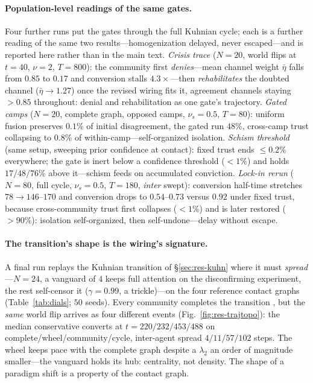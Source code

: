 \documentclass[runningheads]{llncs}
\begin{document}
\paragraph{Population-level readings of the same gates.}
Four further runs put the gates through the full Kuhnian cycle; each is a further reading of
the same two results---homogenization delayed, never escaped---and is reported here rather
than in the main text. \emph{Crisis trace} ($N{=}20$, world flips at $t{=}40$, $\nu{=}2$,
$T{=}800$): the community first \emph{denies}---mean channel weight $\bar\eta$ falls from
$0.85$ to $0.17$ and conversion stalls $4.3\times$---then \emph{rehabilitates} the doubted
channel ($\bar\eta\to1.27$) once the revised wiring fits it, agreement channels staying
$>0.85$ throughout: denial and rehabilitation as one gate's trajectory. \emph{Gated camps}
($N{=}20$, complete graph, opposed camps, $\nu_s{=}0.5$, $T{=}80$): uniform fusion preserves
$0.1\%$ of initial disagreement, the gated run $48\%$, cross-camp trust collapsing to
$0.8\%$ of within-camp---self-organized isolation. \emph{Schism threshold} (same setup,
sweeping prior confidence at contact): fixed trust ends $\le0.2\%$ everywhere; the gate is
inert below a confidence threshold ($<1\%$) and holds $17/48/76\%$ above it---schism feeds
on accumulated conviction. \emph{Lock-in rerun} ($N{=}80$, full cycle, $\nu_s{=}0.5$,
$T{=}180$, \emph{inter} swept): conversion half-time stretches $78\to146$--$170$ and
conversion drops to $0.54$--$0.73$ versus $0.92$ under fixed trust, because cross-community
trust first collapses ($<1\%$) and is later restored ($>90\%$): isolation self-organized,
then self-undone---delay without escape.

\paragraph{The transition's shape is the wiring's signature.}
A final run replays the Kuhnian transition of \S\ref{sec:res-kuhn} where it must
\emph{spread}---$N{=}24$, a vanguard of $4$ keeps full attention on the disconfirming
experiment, the rest self-censor it ($\gamma{=}0.99$, a trickle)---on the four
reference contact graphs (Table~\ref{tab:dials}; $50$ seeds). Every community
completes the transition \citep{zollman2010}, but the \emph{same} world flip arrives
as four different events (Fig.~\ref{fig:res-trajtopo}): the median conservative
converts at $t{=}220/232/453/488$ on complete/wheel/community/cycle, inter-agent
spread $4/11/57/102$ steps. The wheel keeps pace with the complete graph despite a
$\lambda_2$ an order of magnitude smaller---the vanguard holds its hub: centrality,
not density. The shape of a paradigm shift is a property of the contact graph.
\end{document}
